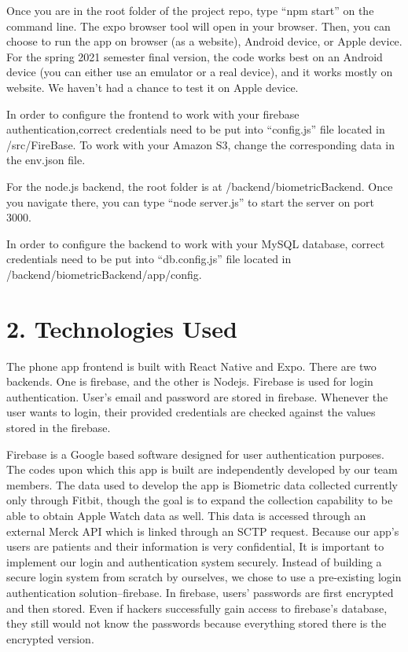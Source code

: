 \documentclass[]{book}
\begin{document}
Once you are in the root folder of the project repo, type ``npm start'' on the command line. The expo browser tool will open in your browser. Then, you can choose to run the app on browser (as a website), Android device, or Apple device. For the spring 2021 semester final version, the code works best on an Android device (you can either use an emulator or a real device), and it works mostly on website. We haven't had a chance to test it on Apple device.

In order to configure the frontend to work with your firebase authentication,correct credentials need to be put into ``config.js'' file located in /src/FireBase. To work with your Amazon S3, change the corresponding data in the env.json file.

For the node.js backend, the root folder is at /backend/biometricBackend. Once you navigate there, you can type ``node server.js'' to start the server on port 3000.

In order to configure the backend to work with your MySQL database, correct credentials need to be put into ``db.config.js'' file located in /backend/biometricBackend/app/config.

\hypertarget{technologies-used}{%
\section{2. Technologies Used}\label{technologies-used}}

The phone app frontend is built with React Native and Expo. There are two backends. One is firebase, and the other is Nodejs. Firebase is used for login authentication. User's email and password are stored in firebase. Whenever the user wants to login, their provided credentials are checked against the values stored in the firebase.

Firebase is a Google based software designed for user authentication purposes. The codes upon which this app is built are independently developed by our team members. The data used to develop the app is Biometric data collected currently only through Fitbit, though the goal is to expand the collection capability to be able to obtain Apple Watch data as well. This data is accessed through an external Merck API which is linked through an SCTP request. Because our app's users are patients and their information is very confidential, It is important to implement our login and authentication system securely. Instead of building a secure login system from scratch by ourselves, we chose to use a pre-existing login authentication solution--firebase. In firebase, users' passwords are first encrypted and then stored. Even if hackers successfully gain access to firebase's database, they still would not know the passwords because everything stored there is the encrypted version.
\end{document}
